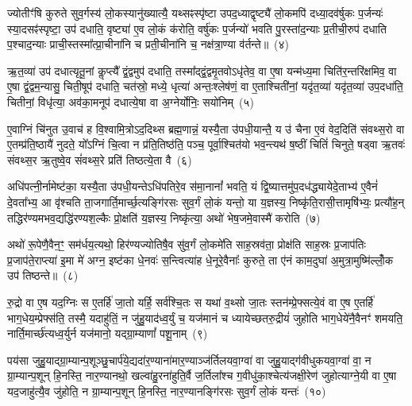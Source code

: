 ज्योतीꣳ॑षि कुरुते सुव॒र्गस्य॑ लो॒कस्यानु॑ख्यात्यै॒ यथ्सꣴस्पृ॑ष्टा उपद॒ध्याद्वृष्ट्यै॑ लो॒कमपि॑ दध्या॒दव॑र्\mbox{}षुकः प॒र्जन्यः॑ स्या॒दसꣴ॑स्पृष्टा॒ उप॑ दधाति॒ वृष्ट्या॑ ए॒व लो॒कं क॑रोति॒ वर्\mbox{}षु॑कः प॒र्जन्यो॑ भवति पु॒रस्ता॑द॒न्याः प्र॒तीची॒रुप॑ दधाति प॒श्चाद॒न्याः प्राची॒स्तस्मा᳚त्प्रा॒चीना॑नि च प्रती॒चीना॑नि च॒ नक्ष॑त्रा॒ण्या व॑र्तन्ते॥~(४)

{\anuvakamend[{भ्रातृ॑व्यो लो॒क ए॒वैतान्येक॑चत्वारिꣳशच्च}]}%

ऋ॒त॒व्या॑ उप॑ दधात्यृतू॒नां कॢप्त्यै᳚ द्वं॒द्वमुप॑ दधाति॒ तस्मा᳚द्द्वं॒द्वमृ॒तवो\-ऽधृ॑तेव॒ वा ए॒षा यन्म॑ध्य॒मा चिति॑र॒न्तरि॑क्षमिव॒ वा ए॒षा द्वं॒द्वम॒न्यासु॒ चिती॒षूप॑ दधाति॒ चत॑स्रो॒ मध्ये॒ धृत्या॑ अन्तः॒श्लेष॑णं॒ वा ए॒ताश्चिती॑नां॒ यदृ॑त॒व्या॑ यदृ॑त॒व्या॑ उप॒दधा॑ति॒ चितीनां॒ विधृ॑त्या॒ अव॑का॒मनूप॑ दधात्ये॒षा वा अ॒ग्नेर्योनिः॒ सयो॑निम्~(५)

ए॒वाग्निं चि॑नुत उ॒वाच॑ ह वि॒श्वामि॒त्रो\-ऽद॒दिथ्स ब्रह्म॒णान्नं॒ यस्यै॒ता उ॑पधी॒यान्तै॒ य उ॑ चैना ए॒वं वेद॒दिति॑ संवथ्स॒रो वा ए॒तम्प्र॑ति॒ष्ठायै॑ नुदते॒ यो᳚\-ऽग्निं चि॒त्वा न प्र॑ति॒तिष्ठ॑ति॒ पञ्च॒ पूर्वा॒श्चित॑यो भव॒न्त्यथ॑ ष॒ष्ठीं चितिं॑ चिनुते॒ षड्वा ऋ॒तवः॑ संवथ्स॒र ऋ॒तुष्वे॒व सं॑वथ्स॒रे प्रति॑ तिष्ठत्ये॒ता वै~(६)

अधि॑पत्नी॒र्नामेष्ट॑का॒ यस्यै॒ता उ॑पधी॒यन्ते\-ऽधि॑पतिरे॒व स॑मा॒नानां᳚ भवति॒ यं द्वि॒ष्यात्तमु॑प॒दध॑द्ध्यायेदे॒ताभ्य॑ ए॒वैनं॑ दे॒वता᳚भ्य॒ आ वृ॑श्चति ता॒जगार्ति॒मार्च्छ॒त्यङ्गि॑रसः सुव॒र्गं लो॒कं यन्तो॒ या य॒ज्ञस्य॒ निष्कृ॑ति॒रासी॒त्तामृषि॑भ्यः॒ प्रत्यौ॑ह॒न् तद्धिर॑ण्यमभव॒द्यद्धि॑रण्यश॒ल्कैः प्रो॒क्षति॑ य॒ज्ञस्य॒ निष्कृ॑त्या॒ अथो॑ भेष॒जमे॒वास्मै॑ करोति~(७)

अथो॑ रू॒पेणै॒वैन॒ꣳ॒ सम॑र्धय॒त्यथो॒ हिर॑ण्यज्योतिषै॒व सु॑व॒र्गं लो॒कमे॑ति साह॒स्रव॑ता॒ प्रोक्ष॑ति साह॒स्रः प्र॒जाप॑तिः प्र॒जाप॑ते॒राप्त्या॑ इ॒मा मे॑ अग्न॒ इष्ट॑का धे॒नवः॑ स॒न्त्वित्या॑ह धे॒नूरे॒वैनाः᳚ कुरुते॒ ता ए॑नं काम॒दुघा॑ अ॒मुत्रा॒मुष्मि॑ल्लोँ॒क उप॑ तिष्ठन्ते॥~(८)

{\anuvakamend[{सयो॑निमे॒ता वै क॑रो॒त्येका॒न्नच॑त्वारि॒ꣳ॒शच्च॑}]}%

रु॒द्रो वा ए॒ष यद॒ग्निः स ए॒तर्\mbox{}हि॑ जा॒तो यर्\mbox{}हि॒ सर्व॑श्चि॒तः स यथा॑ व॒थ्सो जा॒तः स्तन॑म्प्रे॒फ्सत्ये॒वं वा ए॒ष ए॒तर्\mbox{}हि॑ भाग॒धेय॒म्प्रेफ्स॑ति॒ तस्मै॒ यदाहु॑तिं॒ न जु॑हु॒याद॑ध्व॒र्युं च॒ यज॑मानं च ध्यायेच्छतरु॒द्रीयं॑ जुहोति भाग॒धेये॑नै॒वैनꣳ॑ शमयति॒ नार्ति॒मार्च्छ॑त्यध्व॒र्युर्न यज॑मानो॒ यद्ग्रा॒म्याणां᳚ पशू॒नाम्~(९)

पय॑सा जुहु॒याद्ग्रा॒म्यान्प॒शूञ्छु॒चार्प॑ये॒द्यदा॑र॒ण्याना॑मार॒ण्याञ्ज॑र्तिलयवा॒ग्वा॑ वा जुहु॒याद्ग॑वीधुकयवा॒ग्वा॑ वा॒ न ग्रा॒म्यान्प॒शून् हि॒नस्ति॒ नार॒ण्यानथो॒ खल्वा॑हु॒रना॑हुति॒र्वै ज॒र्तिला᳚श्च ग॒वीधु॑का॒श्चेत्य॑जक्षी॒रेण॑ जुहोत्याग्ने॒यी वा ए॒षा यद॒जाहु॑त्यै॒व जु॑होति॒ न ग्रा॒म्यान्प॒शून् हि॒नस्ति॒ नार॒ण्यानङ्गि॑रसः सुव॒र्गं लो॒कं यन्तः॑~(१०)

